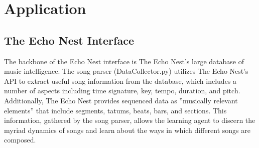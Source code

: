 \documentclass{article}
\begin{document}
\section{Application}
\subsection{The Echo Nest Interface}
The backbone of the Echo Nest interface is The Echo Nest’s large database of music intelligence. The song parser (DataCollector.py) utilizes The Echo Nest’s API to extract useful song information from the database, which includes a number of aspects including time signature, key, tempo, duration, and pitch. Additionally, The Echo Nest provides sequenced data as ”musically relevant elements” that include segments, tatums, beats, bars, and sections.  This information, gathered by the song parser, allows the learning agent to discern the myriad dynamics of songs and learn about the ways in which different songs are composed.
\end{document}

